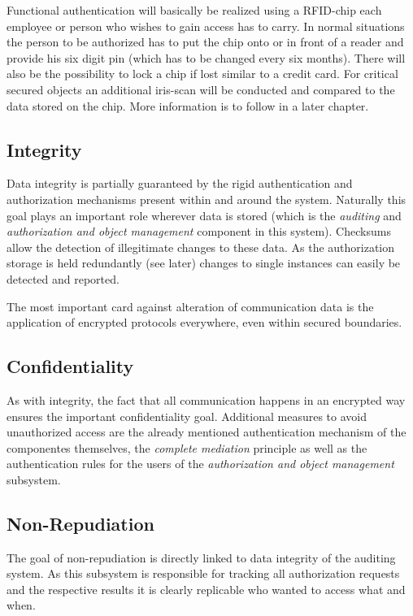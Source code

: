 \documentclass[12pt,a4paper,titlepage,oneside]{scrartcl}
\begin{document}
Functional authentication will basically be realized using a RFID-chip each employee or person who wishes to gain access has to carry.
In normal situations the person to be authorized has to put the chip onto or in front of a reader and provide his six digit pin
(which has to be changed every six months). There will also be the possibility to lock a chip if lost similar to a credit card.
For critical secured objects an additional iris-scan will be conducted and compared to the data stored on the chip.
More information is to follow in a later chapter.


\subsection{Integrity}
Data integrity is partially guaranteed by the rigid authentication and authorization mechanisms present within and around the system.
Naturally this goal plays an important role wherever data is stored (which is the \emph{auditing} and \emph{authorization and object management}
component in this system). Checksums allow the detection of illegitimate changes to these data. As the authorization storage is held
redundantly (see later) changes to single instances can easily be detected and reported.

The most important card against alteration of communication data is the application of encrypted protocols everywhere, even within
secured boundaries.


\subsection{Confidentiality}
As with integrity, the fact that all communication happens in an encrypted way ensures the important confidentiality goal. Additional
measures to avoid unauthorized access are the already mentioned authentication mechanism of the componentes themselves, the
\emph{complete mediation} principle as well as the authentication rules for the users of the \emph{authorization and object management}
subsystem.


\subsection{Non-Repudiation}
The goal of non-repudiation is directly linked to data integrity of the auditing system. As this subsystem is responsible for tracking
all authorization requests and the respective results it is clearly replicable who wanted to access what and when.
\end{document}
